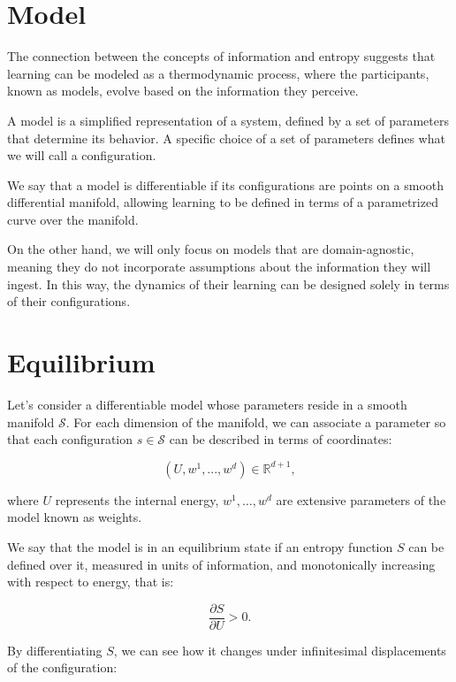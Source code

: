 \documentclass[12pt]{article}
\begin{document}
\section*{Model}

The connection between the concepts of information and entropy \cite{baez_entropy} suggests that learning can be modeled as a thermodynamic process, where the participants, known as models, evolve based on the information they perceive.
 
A model is a simplified representation of a system, defined by a set of parameters that determine its behavior. A specific choice of a set of parameters defines what we will call a configuration.

We say that a model is differentiable if its configurations are points on a smooth differential manifold, allowing learning to be defined in terms of a parametrized curve over the manifold. \cite{lee_smooth}

On the other hand, we will only focus on models that are domain-agnostic, meaning they do not incorporate assumptions about the information they will ingest. In this way, the dynamics of their learning can be designed solely in terms of their configurations.

\section*{Equilibrium}

Let's consider a differentiable model whose parameters reside in a smooth manifold $\mathcal{S}$. For each dimension of the manifold, we can associate a parameter so that each configuration $s \in \mathcal{S}$ can be described in terms of coordinates:

\begin{equation}
(U, w^1, ..., w^d) \in \mathbb{R}^{d+1},
\end{equation}

where $U$ represents the internal energy, $w^1, \dots, w^d$ are extensive parameters of the model known as weights.

We say that the model is in an equilibrium state \cite{callen_thermo} if an entropy function $S$ can be defined over it, measured in units of information, and monotonically increasing with respect to energy, that is:

\begin{equation}
\frac{\partial S}{\partial U} > 0.
\end{equation}

By differentiating $S$, we can see how it changes under infinitesimal displacements of the configuration:
\end{document}
